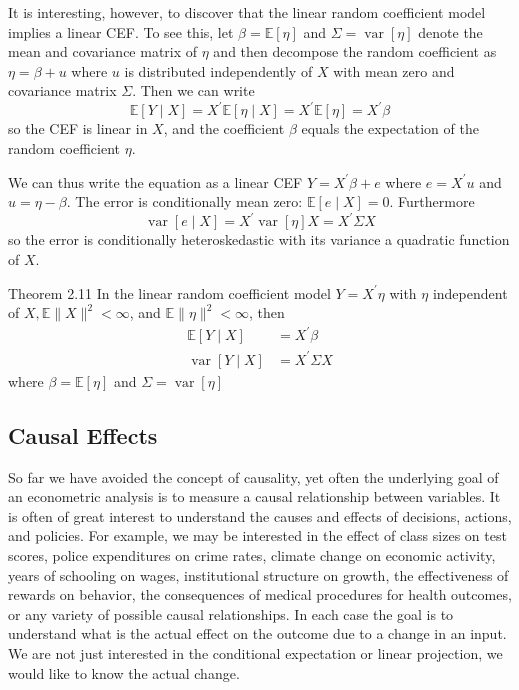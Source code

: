 \documentclass[10pt]{article}
\begin{document}
It is interesting, however, to discover that the linear random coefficient model implies a linear CEF. To see this, let $\beta=\mathbb{E}[\eta]$ and $\Sigma=\operatorname{var}[\eta]$ denote the mean and covariance matrix of $\eta$ and then decompose the random coefficient as $\eta=\beta+u$ where $u$ is distributed independently of $X$ with mean zero and covariance matrix $\Sigma$. Then we can write
$$
\mathbb{E}[Y \mid X]=X^{\prime} \mathbb{E}[\eta \mid X]=X^{\prime} \mathbb{E}[\eta]=X^{\prime} \beta
$$
so the CEF is linear in $X$, and the coefficient $\beta$ equals the expectation of the random coefficient $\eta$.

We can thus write the equation as a linear CEF $Y=X^{\prime} \beta+e$ where $e=X^{\prime} u$ and $u=\eta-\beta$. The error is conditionally mean zero: $\mathbb{E}[e \mid X]=0$. Furthermore
$$
\operatorname{var}[e \mid X]=X^{\prime} \operatorname{var}[\eta] X=X^{\prime} \Sigma X
$$
so the error is conditionally heteroskedastic with its variance a quadratic function of $X$.

Theorem 2.11 In the linear random coefficient model $Y=X^{\prime} \eta$ with $\eta$ independent of $X, \mathbb{E}\|X\|^{2}<\infty$, and $\mathbb{E}\|\eta\|^{2}<\infty$, then
$$
\begin{aligned}
\mathbb{E}[Y \mid X] &=X^{\prime} \beta \\
\operatorname{var}[Y \mid X] &=X^{\prime} \Sigma X
\end{aligned}
$$
where $\beta=\mathbb{E}[\eta]$ and $\Sigma=\operatorname{var}[\eta]$

\subsection{Causal Effects}
So far we have avoided the concept of causality, yet often the underlying goal of an econometric analysis is to measure a causal relationship between variables. It is often of great interest to understand the causes and effects of decisions, actions, and policies. For example, we may be interested in the effect of class sizes on test scores, police expenditures on crime rates, climate change on economic activity, years of schooling on wages, institutional structure on growth, the effectiveness of rewards on behavior, the consequences of medical procedures for health outcomes, or any variety of possible causal relationships. In each case the goal is to understand what is the actual effect on the outcome due to a change in an input. We are not just interested in the conditional expectation or linear projection, we would like to know the actual change.
\end{document}
